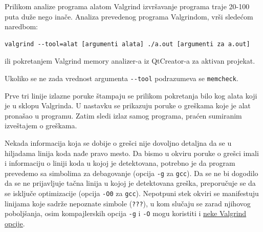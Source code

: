 Prilikom analize programa alatom Valgrind izvršavanje programa traje 20-100 puta duže nego inače. Analiza prevedenog programa Valgrindom, vrši sledećom naredbom:

\begin{verbatim}
valgrind --tool=alat [argumenti alata] ./a.out [argumenti za a.out]
\end{verbatim}

ili pokretanjem Valgrind memory analizer-a iz QtCreator-a za aktivan projekat.

Ukoliko se ne zada vrednost argumenta \texttt{-\/-tool} podrazumeva se \texttt{memcheck}.

Prve tri linije izlazne poruke štampaju se prilikom pokretanja bilo kog alata koji je u sklopu Valgrinda. U nastavku se prikazuju poruke o greškama koje je alat pronašao u programu. Zatim sledi izlaz samog programa, praćen sumiranim izveštajem o greškama.

Nekada informacija koja se dobije o grešci nije dovoljno detaljna da se u hiljadama linija koda nađe pravo mesto. Da bismo u okviru poruke o grešci imali i informaciju o liniji koda u kojoj je detektovana, potrebno je da program prevedemo sa simbolima za debagovanje (opcija \texttt{-g} za \texttt{gcc}). Da se ne bi dogodilo da se ne prijavljuje tačna linija u kojoj je detektovana greška, preporučuje se da se isključe optimizacije (opcija \texttt{-O0} za \texttt{gcc}). Nepotpuni stek okviri se manifestuju linijama koje sadrže nepoznate simbole (\texttt{???}), u kom slučaju se zarad njihovog poboljšanja, osim kompajlerskih opcija \texttt{-g} i \texttt{-O} mogu koristiti i \href{https://valgrind.org/docs/manual/faq.html\#faq.unhelpful}{neke Valgrind opcije}.
